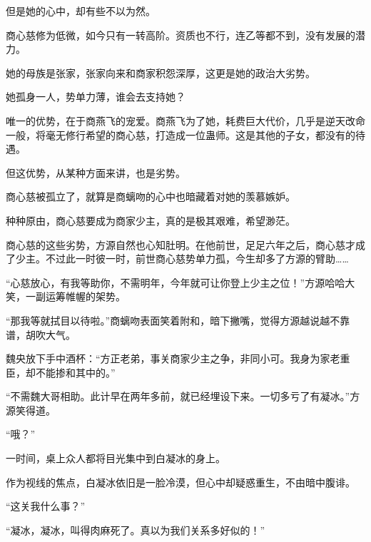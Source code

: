 \begin{this_body}
但是她的心中，却有些不以为然。

商心慈修为低微，如今只有一转高阶。资质也不行，连乙等都不到，没有发展的潜力。

她的母族是张家，张家向来和商家积怨深厚，这更是她的政治大劣势。

她孤身一人，势单力薄，谁会去支持她？

唯一的优势，在于商燕飞的宠爱。商燕飞为了她，耗费巨大代价，几乎是逆天改命一般，将毫无修行希望的商心慈，打造成一位蛊师。这是其他的子女，都没有的待遇。

但这优势，从某种方面来讲，也是劣势。

商心慈被孤立了，就算是商螭吻的心中也暗藏着对她的羡慕嫉妒。

种种原由，商心慈要成为商家少主，真的是极其艰难，希望渺茫。

商心慈的这些劣势，方源自然也心知肚明。在他前世，足足六年之后，商心慈才成了少主。不过此一时彼一时，前世商心慈势单力孤，今生却多了方源的臂助……

“心慈放心，有我等助你，不需明年，今年就可让你登上少主之位！”方源哈哈大笑，一副运筹帷幄的架势。

“那我等就拭目以待啦。”商螭吻表面笑着附和，暗下撇嘴，觉得方源越说越不靠谱，胡吹大气。

魏央放下手中酒杯：“方正老弟，事关商家少主之争，非同小可。我身为家老重臣，却不能掺和其中的。”

“不需魏大哥相助。此计早在两年多前，就已经埋设下来。一切多亏了有凝冰。”方源笑得道。

“哦？”

一时间，桌上众人都将目光集中到白凝冰的身上。

作为视线的焦点，白凝冰依旧是一脸冷漠，但心中却疑惑重生，不由暗中腹诽。

“这关我什么事？”

“凝冰，凝冰，叫得肉麻死了。真以为我们关系多好似的！”

\end{this_body}

